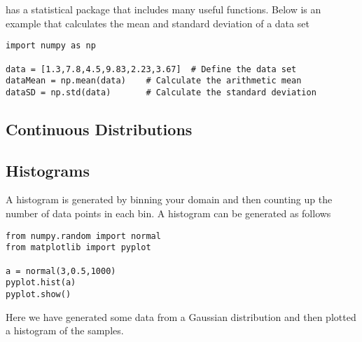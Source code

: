  has a statistical package that includes many useful
functions.  Below is an example that calculates the mean and standard
deviation of a data set
\begin{Verbatim}
import numpy as np

data = [1.3,7.8,4.5,9.83,2.23,3.67]  # Define the data set
dataMean = np.mean(data)    # Calculate the arithmetic mean
dataSD = np.std(data)       # Calculate the standard deviation
\end{Verbatim}

\subsection*{Continuous Distributions}


\subsection*{Histograms}

A histogram is generated by binning your domain and then counting up
the number of data points in each bin.  A histogram can be generated
as follows
\begin{Verbatim}
from numpy.random import normal
from matplotlib import pyplot

a = normal(3,0.5,1000)
pyplot.hist(a)
pyplot.show()
\end{Verbatim}
Here we have generated some data from a Gaussian distribution and then
plotted a histogram of the samples.




